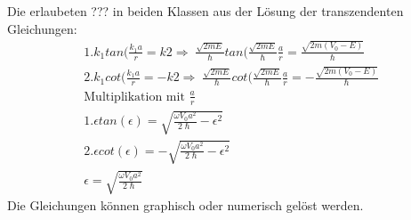 \documentclass[10pt,a4paper]{article}
\begin{document}
Die erlaubeten ??? in beiden Klassen aus der Lösung der transzendenten Gleichungen:\\
\begin{align}
1. k_1tan(\frac{k_1a}{r}=k2\Rightarrow\;\frac{\sqrt{2mE}}{\hslash}tan(\frac{\sqrt{2mE}}{\hslash}\frac{a}{r}=\frac{\sqrt{2m(V_0-E)}}{\hslash}\\
2. k_1cot(\frac{k_1a}{r}=-k2 \Rightarrow \; \frac{\sqrt{2mE}}{\hslash}cot(\frac{\sqrt{2mE}}{\hslash}\frac{a}{r}=-\frac{\sqrt{2m(V_0-E)}}{\hslash}\\
\text{Multiplikation mit $\frac{a}{r}$}\\
1. \epsilon tan(\epsilon)= \sqrt{\frac{\omega V_0 a^2}{2\hslash}-\epsilon^2}\\
2. \epsilon cot(\epsilon)= -\sqrt{\frac{\omega V_0 a^2}{2\hslash}-\epsilon^2}\\
\epsilon=\sqrt{\frac{\omega V_0 a^2}{2\hslash}}
\end{align}
Die Gleichungen können graphisch oder numerisch gelöst werden.
\pagebreak
\end{document}
